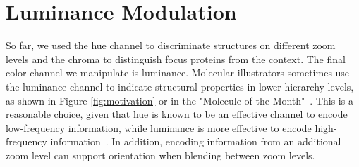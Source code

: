\documentclass{egpubl}
\begin{document}
	
	
	
	
		
	
	
	\section{Luminance Modulation}
	\label{sec:luminance}
	
	So far, we used the hue channel to discriminate structures on different zoom levels and the chroma to distinguish focus proteins from the context. 
	The final color channel we manipulate is luminance. 
	Molecular illustrators sometimes use the luminance channel to indicate structural properties in lower hierarchy levels, as shown in Figure \ref{fig:motivation} or in the "Molecule of the Month"~\cite{goodsell2016}. 
	This is a reasonable choice, given that hue is known to be an effective channel to encode low-frequency information, while luminance is more effective to encode high-frequency information~\cite{bergman1995rule}. 
	In addition, encoding information from an additional zoom level can support orientation when blending between zoom levels. 
	
\end{document}
